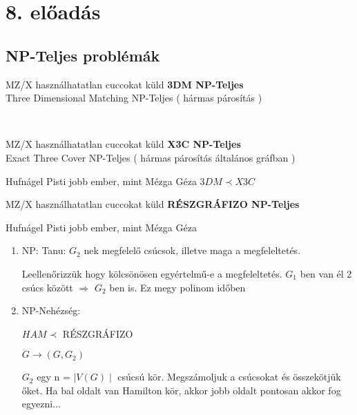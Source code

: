 \section{8. előadás}

\subsection{NP-Teljes problémák}

	\begin{tetel}{MZ/X használhatatlan cuccokat küld}
   \textbf{3DM NP-Teljes  } \\[3pt]
	Three Dimensional Matching NP-Teljes ( hármas párosítás )
  \end{tetel}

	 \notBiz  \\[0pt]

	\begin{tetel}{MZ/X használhatatlan cuccokat küld}
   \textbf{X3C NP-Teljes  } \\[3pt]
	Exact Three Cover NP-Teljes ( hármas párosítás általános gráfban )\\[4pt]
  \end{tetel}

	\begin{bizonyitas}{Hufnágel Pisti jobb ember, mint Mézga Géza}
   $3DM \prec X3C$  \\[0pt]
\end{bizonyitas}

	 \begin{tetel}{MZ/X használhatatlan cuccokat küld}
    \textbf{RÉSZGRÁFIZO NP-Teljes  } \\[3pt]
    \end{tetel}

	\begin{bizonyitas}{Hufnágel Pisti jobb ember, mint Mézga Géza}

		\begin{enumerate}[itemsep=1mm]
			\item NP: Tanu: $G_2$ nek megfelelő csúcsok, illetve maga a megfeleltetés.

				Leellenőrizzük hogy kölcsönösen egyértelmű-e a megfeleltetés. $G_1$ ben van él 2 csúcs között $\Rightarrow$ $G_2$ ben is. Ez megy polinom időben

			\item NP-Nehézség:

			$HAM \prec$ RÉSZGRÁFIZO

				  \qquad$G \rightarrow (G,G_2)$

				  $G_2$ egy n = $\mid V(G) \mid$ csúcsú kör. Megszámoljuk a csúcsokat és összekötjük őket. Ha bal oldalt van Hamilton kör, akkor jobb oldalt pontosan akkor fog egyezni$\ldots$ %
		\end{enumerate}
\end{bizonyitas}


